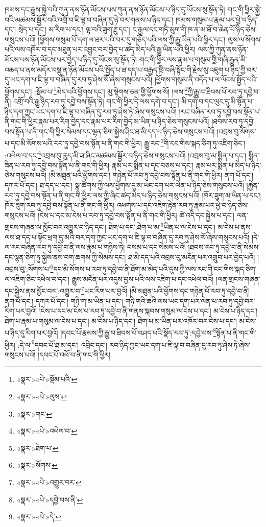 ཁམས་དང་རྒྱུས་སྐྱེ་བའི་ཀུན་ནས་ཉོན་མོངས་པས་ཀུན་ནས་ཉོན་མོངས་པ་ཉིད་དུ་ཡོངས་སུ་སྟོན་ཏེ། གང་གི་ཕྱིར་སྐྱེ་བའི་མཚམས་སྦྱོར་བའི་འགྲོ་བ་ཇི་ལྟ་བ་བཞིན་དུ་ཉེ་བར་གནས་པ་ཉིད་དང་། ཁམས་གསུམ་པ་རྣམ་པར་ཕྱེ་བ་ཉིད་དང་། སྲེད་པ་དང་། མ་རིག་པ་དང་། ལྟ་བའི་ཟུག་རྔུ་དང་། ང་རྒྱལ་དང་གཏི་མུག་གི་ཁ་ན་མ་ཐོ་བ་ཆེན་པོ་ཉིད་ཅེས་གསུངས་པའོ། །ཕྱོགས་གསུམ་པོ་དག་ལ་ཐར་པའི་བར་དུ་གཅོད་པའི་ལས་ཀྱི་རྒྱུ་ཡིན་པའི་ཕྱིར་དང་། ལུས་ལ་སོགས་པའི་ལས་འཁོར་བ་དང་མཐུན་པར་འབྱུང་བར་བྱེད་པ་ཚད་མེད་པའི་རྒྱུ་ཡིན་པའི་ཕྱིར། ལས་ཀྱི་ཀུན་ནས་ཉོན་མོངས་པས་ཉོན་མོངས་པར་བྱེད་པ་ཉིད་དུ་ཡོངས་སུ་སྟོན་ཏེ། གང་གི་ཕྱིར་ལས་རྣམ་པ་གསུམ་གྱི་གཞི་རྒྱུན་མི་འཆད་པ་ནས་མདོར་བསྡུ་ན་ཉོན་མོངས་པའི་སྤྱོད་པ་ཐ་དད་པ་བརྒྱད་ཁྲི་བཞི་སྟོང་གི་རྗེས་སུ་འཇུག་པ་ཉིད་ཀྱི་བར་དུ་ཡང་དག་པ་ཇི་ལྟ་བ་བཞིན་དུ་རབ་ཏུ་ཤེས་སོ་ཞེས་གསུངས་པའོ། །ཕྱོགས་གསུམ་ནི་འདོད་པ་ལ་ལོངས་སྤྱོད་པའི་ཕྱོགས་དང་། :སྡོམ་པ་\footnote{«སྣར་»«པེ་»སྡོམ་པའི་}མེད་པའི་ཕྱོགས་དང་། མུ་སྟེགས་ཅན་གྱི་ཕྱོགས་སོ། །ལས་\footnote{«སྣར་»«པེ་»ལུས་}ཀྱི་རྒྱུ་བ་ཐིབས་པོ་རབ་ཏུ་དབྱེ་བ་ནི། འགྲོ་བའི་རྒྱུ་ཉིད་རབ་ཏུ་དབྱེ་བས་སྟོན་ཏེ། གང་གི་ཕྱིར་དེ་ལས་དགེ་བ་དང་། མི་དགེ་བ་དང་ལུང་དུ་མི་སྟོན་པ་ཉིད་དག་ཀྱང་ཡང་དག་པ་ཇི་ལྟ་བ་བཞིན་དུ་རབ་ཏུ་ཤེས་ཏེ་ཞེས་གསུངས་པའོ། །རང་བཞིན་རབ་ཏུ་དབྱེ་བས་སྟོན་པ་ནི་གང་གི་ཕྱིར་རྣམ་པར་རིག་བྱེད་དང་རྣམ་པར་རིག་བྱེད་མ་ཡིན་པ་ཉིད་ཅེས་གསུངས་པའོ། །ཐབས་རབ་ཏུ་དབྱེ་བས་སྟོན་པ་ནི་གང་གི་ཕྱིར་སེམས་དང་ལྷན་ཅིག་སྐྱེས་ཤིང་ཐ་མི་དད་པ་ཉིད་ཅེས་གསུངས་པའོ། །འབྲས་བུ་སོགས་པ་དང་མི་སོགས་པའི་རབ་ཏུ་དབྱེ་བས་སྟོན་པ་ནི་གང་གི་ཕྱིར། རྒྱུ་རང་\footnote{«སྣར་»གང་}གི་ངང་གིས་སྐད་ཅིག་ཏུ་འཇིག་ཅིང་། :འཕེལ་བ་དང་\footnote{«སྣར་»«པེ་»འཕེལ་བ་}འབྲས་བུ་ཆུད་མི་ཟ་ཞིང་མཚམས་སྦྱོར་བ་ཉིད་ཅེས་གསུངས་པའོ། །འབྲས་བུ་མ་སྨིན་པ་དང་། སྨིན་ཟིན་པ་རབ་ཏུ་དབྱེ་བས་སྟོན་པ་ནི་གང་གི་ཕྱིར། རྣམ་པར་སྨིན་པ་དང་བཅས་པ་དང་། རྣམ་པར་སྨིན་པ་མེད་པ་ཉིད་ཅེས་གསུངས་པའོ། །མི་མཐུན་པའི་ཕྱོགས་དང་། གཉེན་པོ་རབ་ཏུ་དབྱེ་བས་སྟོན་པ་ནི་གང་གི་ཕྱིར། ནག་པོ་དང་། དཀར་པོ་དང་། ཐ་དད་པ་དང་། སྣ་ཚོགས་ཀྱི་ལས་ཕྱོགས་དུ་མ་ཡང་དག་པར་ལེན་པ་ཉིད་ཅེས་གསུངས་པའོ། །རྐྱེན་རབ་ཏུ་དབྱེ་བས་སྟོན་པ་ནི་གང་གི་ཕྱིར་ལས་ཀྱི་ཞིང་ཚད་མེད་པ་ཉིད་ཅེས་གསུངས་པའོ། །ཁོར་ཟུག་མ་ཡིན་པ་དང་། ཁོར་ཟུག་རབ་ཏུ་དབྱེ་བས་སྟོན་པ་ནི་གང་གི་ཕྱིར། འཕགས་པ་དང་འཇིག་རྟེན་རབ་ཏུ་རྣམ་པར་ཕྱེ་བ་ཉིད་ཅེས་གསུངས་པའོ། །ངེས་པ་དང་མ་ངེས་པ་རབ་ཏུ་དབྱེ་བས་སྟོན་པ་ནི་གང་གི་ཕྱིར། ཚེ་འདི་དང་སྐྱེས་པ་དང་། ལན་གྲངས་གཞན་ལ་མྱོང་བར་འགྱུར་བ་ཉིད་དང་། ཐེག་པ་དང་:ཐེག་པ་མ་\footnote{«སྣར་»ཐེག་པ་}ཡིན་པ་ལ་ངེས་པ་དང་། མ་ངེས་པ་ནས་ལས་ཐ་དད་པ་སྟོང་ཕྲག་དུ་མའི་བར་དག་ཀྱང་ཡང་དག་པ་ཇི་ལྟ་བ་བཞིན་དུ་རབ་ཏུ་ཤེས་སོ་ཞེས་གསུངས་པའོ། །དེ་ལ་རང་བཞིན་རབ་ཏུ་དབྱེ་བ་ནི་ལས་རྣམ་པ་གཉིས་ཏེ། བསམ་པ་དང་སེམས་པའོ། །ཐབས་རབ་ཏུ་དབྱེ་བ་ནི་སེམས་དང་ལྷན་ཅིག་ཏུ་སྐྱེས་ནས་བག་ཆགས་ཀྱི་སེམས་དང་། ཐ་མི་དད་པའི་འབྲས་བུ་མངོན་པར་འགྲུབ་པར་བྱེད་པའོ། །འབྲས་བུ་:སོགས་པ་\footnote{«སྣར་»སོགས་}དང་མི་སོགས་པ་རབ་ཏུ་དབྱེ་བ་ནི་ཐོག་མ་མེད་པའི་དུས་ཀྱི་ལས་རང་གི་ངང་གིས་སྐད་ཅིག་ལ་འཇིག་ཅིང་འཕེལ་བ་དང་། རྒྱུས་མངོན་པར་འདུས་བྱས་པའི་ལས་འཇིག་པ་དང་འཕེལ་བའོ། །ལན་གྲངས་གཞན་དང་སྐྱེས་ནས་མྱོང་བར་:འགྱུར་བ་\footnote{«སྣར་»«པེ་»འགྱུར་བར་}ཡང་རིག་པར་བྱའོ། །མི་མཐུན་པའི་ཕྱོགས་དང་གཉེན་པོ་རབ་ཏུ་དབྱེ་བ་ནི། ནག་པོ་དང་། དཀར་པོ་དང་། གཉི་ག་མ་ཡིན་པ་དང་། གཉི་གའི་ཆའི་ལས་ཡང་དག་པར་ལེན་པ་རབ་ཏུ་དབྱེ་བར་རིག་པར་བྱའོ། །ངེས་པ་དང་མ་ངེས་པ་རབ་ཏུ་དབྱེ་བ་ནི་གནས་སྐབས་གསུམ་ལ་ངེས་པ་དང་། མ་ངེས་པ་ཉིད་དང་། ཐེག་པ་རྣམ་པ་གསུམ་ལ་ངེས་པ་དང་། མ་ངེས་པ་ཉིད་དང་། ཐེག་པ་མ་ཡིན་པར་འཁོར་བར་ངེས་པ་དང་། མ་ངེས་པ་ཉིད་དུ་རིག་པར་བྱའོ། །དབང་པོ་རྣམས་ཀྱི་རྒྱུ་བ་ཐིབས་པོ་བཤད་པའི་སྣོད་རབ་ཏུ་:དབྱེ་བས་\footnote{«སྣར་»«པེ་»དབྱེ་བས་ནི་}སྟོན་པ་ནི་གང་གི་ཕྱིར། :དེ་ལ་\footnote{«སྣར་»«པེ་»དེ་}དབང་པོ་ཐ་མ་དང་། འབྲིང་དང་། རབ་ཉིད་ཀྱང་ཡང་དག་པ་ཇི་ལྟ་བ་བཞིན་དུ་རབ་ཏུ་ཤེས་ཏེ་ཞེས་གསུངས་པའོ། །དབང་པོ་འཕོ་བ་ནི་གང་གི་ཕྱིར། 